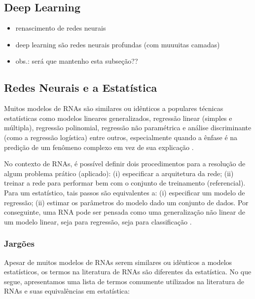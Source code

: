 \documentclass{automatextcc}
\begin{document}
\subsection{Deep Learning}

\begin{itemize}
    \item renascimento de redes neurais 
    \item deep learning são redes neurais profundas (com muuuitas camadas)
    \item obs.: será que mantenho esta subseção??
\end{itemize}


\subsection{Redes Neurais e a Estatística}
Muitos modelos de RNAs são similares ou idênticos a populares técnicas estatísticas como modelos lineares generalizados, regressão linear (simples e múltipla), regressão polinomial, regressão não paramétrica e análise discriminante (como a regressão logística) entre outros, especialmente quando a ênfase é na predição de um fenômeno complexo em vez de sua explicação \citep{sarle1994, cheng1994}.

No contexto de RNAs, é possível definir dois procedimentos para a resolução de algum problema prático (aplicado): (i) especificar a arquitetura da rede; (ii) treinar a rede para performar bem com o conjunto de treinamento (referencial). Para um estatístico, tais passos são equivalentes a: (i) especificar um modelo de regressão; (ii) estimar os parâmetros do modelo dado um conjunto de dados. Por conseguinte, uma RNA pode ser pensada como uma generalização não linear de um modelo linear, seja para regressão, seja para classificação \citep{cheng1994, hastie2009}. 


\subsubsection{Jargões} 
Apesar de muitos modelos de RNAs serem similares ou idênticos a modelos estatísticos, os termos na literatura de RNAs são diferentes da estatística. No que segue, apresentamos uma lista de termos comumente utilizados na literatura de RNAs e suas equivalências em estatística:
\end{document}
